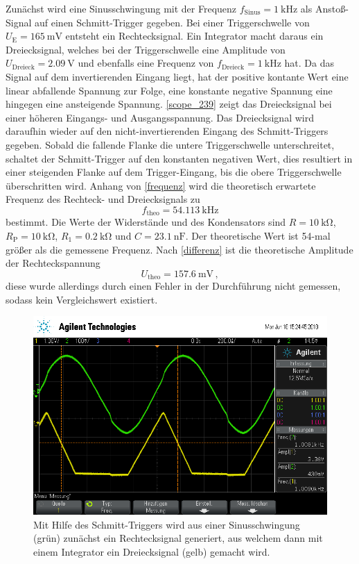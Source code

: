 Zunächst wird eine Sinusschwingung mit der Frequenz $f_\text{Sinus} = \SI{1}{\kilo\hertz}$ als Anstoß-Signal auf einen Schmitt-Trigger gegeben. Bei einer Triggerschwelle von $U_\text{E} = \SI{165}{\milli\volt}$ entsteht ein Rechtecksignal. Ein Integrator macht daraus ein Dreiecksignal, welches bei der Triggerschwelle eine Amplitude von $U_\text{Dreieck} = \SI{2.09}{\volt}$ und ebenfalls eine Frequenz von $f_\text{Dreieck} = \SI{1}{\kilo\hertz}$ hat. Da das Signal auf dem invertierenden Eingang liegt, hat der positive kontante Wert eine linear abfallende Spannung zur Folge, eine konstante negative Spannung eine hingegen eine ansteigende Spannung. \autoref{scope_239} zeigt das Dreiecksignal bei einer höheren Eingangs- und Ausgangsspannung. Das Dreiecksignal wird daraufhin wieder auf den nicht-invertierenden Eingang des Schmitt-Triggers gegeben. Sobald die fallende Flanke die untere Triggerschwelle unterschreitet, schaltet der Schmitt-Trigger auf den konstanten negativen Wert, dies resultiert in einer steigenden Flanke auf dem Trigger-Eingang, bis die obere Triggerschwelle überschritten wird. Anhang von \autoref{frequenz} wird die theoretisch erwartete Frequenz des Rechteck- und Dreiecksignals zu
\begin{equation*}
	f_\text{theo} = \SI{54.113}{\kilo\hertz}
\end{equation*}
bestimmt. Die Werte der Widerstände und des Kondensators sind $R = \SI{10}{\kilo\ohm}$, $R_\text{P} = \SI{10}{\kilo\ohm}$, $R_1 = \SI{0.2}{\kilo\ohm}$ und $C = \SI{23.1}{\nano\farad}$. Der theoretische Wert ist 54-mal größer als die gemessene Frequenz. Nach \autoref{differenz} ist die theoretische Amplitude der Rechteckspannung
\begin{equation*}
	U_\text{theo} = \SI{157.6}{\milli\volt}\, ,
\end{equation*}
diese wurde allerdings durch einen Fehler in der Durchführung nicht gemessen, sodass kein Vergleichswert existiert.
\begin{figure}[h]
	\centering
	\includegraphics[width=\textwidth]{usb/scope_239.png}
	\caption{Mit Hilfe des Schmitt-Triggers wird aus einer Sinusschwingung (grün) zunächst ein Rechtecksignal generiert, aus welchem dann mit einem Integrator ein Dreiecksignal (gelb) gemacht wird.}
	\label{scope_239}
\end{figure}

